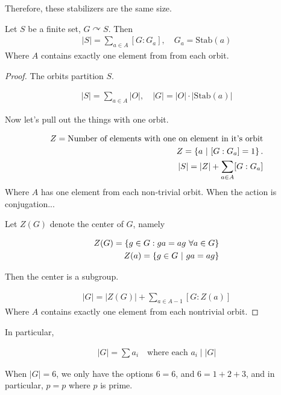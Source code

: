 \documentclass[12pt, twosided]{article}
\begin{document}
Therefore, these stabilizers are the same size.

\begin{prop}
  Let \(S\) be a finite set, \(G \curvearrowright S\). Then
  \begin{align*}
    |S| = \sum_{a \in A} [G: G_a], \quad G_a = \mathrm{Stab}(a)
  \end{align*}
  Where \(A\) contains exactly one element from from each orbit.
\end{prop}
\begin{proof}
  The orbits partition \(S\).

  \begin{align*}
    |S| = \sum_{a \in A}|O|, \quad |G| = |O| \cdot |\mathrm{Stab}(a)|
  \end{align*}

  Now let's pull out the things with one orbit.

  \begin{align*}
    Z = \text{Number of elements with one on element in it's orbit} \\
    Z = \left\{ a \ \middle\vert\  [G:G_a] = 1 \right\}. \\
    |S| = |Z| + \sum_{a \in A}[G: G_a]
  \end{align*}
  Where \(A\) has one element from each non-trivial orbit. When the action is conjugation...

  Let \(Z(G)\) denote the center of \(G\), namely

  \begin{align*}
    Z(G) = \left\{ g \in G: ga = ag\ \forall a \in G \right\} \\
    Z(a) = \left\{ g \in G \ \middle\vert\  ga = ag \right\}
  \end{align*}

  Then the center is a subgroup.

  \begin{align*}
    |G| = |Z(G)| + \sum_{a \in A-1}[G:Z(a)]
  \end{align*}
  Where \(A\) contains exactly one element from each nontrivial orbit.
\end{proof}
In particular,

\begin{align*}
  |G| = \sum a_i \quad \text{where each } a_i \mid |G|
\end{align*}
\begin{exa}
  When \(|G| = 6\), we only have the options \(6 = 6\), and \(6 = 1 + 2 + 3\), and in particular,
  \(p = p\) where \(p\) is prime.
\end{exa}
\end{document}
